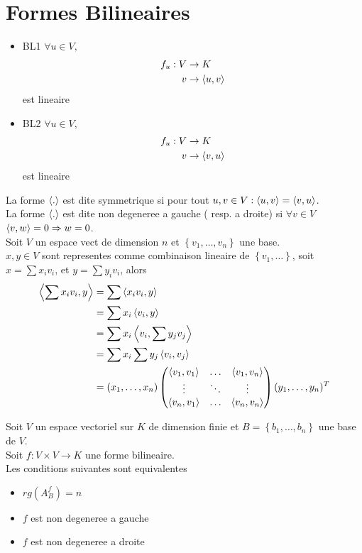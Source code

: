 \documentclass[../main.tex]{subfiles}
\begin{document}
\section{Formes Bilineaires}
\begin{defn}
	\begin{itemize}
	\item BL1 $\forall u \in V,$ 
		\begin{align*}
			f_u: V &\to K\\
			v &\to \left\langle u,v\right\rangle
		\end{align*}
		est lineaire
	
	\item BL2 $\forall u \in V,$ 
		\begin{align*}
			f_u: V &\to K\\
			v &\to \left\langle v,u\right\rangle
		\end{align*}
		est lineaire
	
	\end{itemize}
	
	
\end{defn}
La forme $\left\langle.\right\rangle$ est dite symmetrique si pour tout $u,v \in V: \left\langle u,v\right\rangle= \left\langle v,u\right\rangle$.\\
La forme $\left\langle.\right\rangle$ est dite non degeneree a gauche ( resp. a droite) si
$\forall v \in V$ $\left\langle v,w\right\rangle=0 \Rightarrow w=0$.\\
Soit $V$ un espace vect de dimension $n$ et $ \left\{ v_1, \ldots, v_n \right\} $ une base.\\
$ x,y \in V$ sont representes comme combinaison lineaire de $ \left\{ v_1, \ldots \right\} $, soit $x = \sum x_i v_i$, et $ y = \sum y_i v_i$, alors
\begin{align*}
	\left\langle \sum x_i v_i, y\right\rangle &= \sum \left\langle x_i v_i, y\right\rangle \\
				&= \sum x_i \left\langle v_i, y\right\rangle \\
				&= \sum x_i \left\langle v_i, \sum y_j v_j\right\rangle\\
				&= \sum x_i \sum y_j \left\langle v_i, v_j\right\rangle\\
				&= ( x_1, \ldots, x_n) 
				\begin{pmatrix}
					\left\langle v_1, v_1\right\rangle & \ldots & \left\langle v_1, v_n \right\rangle \\
\vdots & \ddots & \vdots \\
\left\langle v_n, v_1\right\rangle  & \ldots & \left\langle v_n,v_n\right\rangle 
				\end{pmatrix}
				( y_1, \ldots, y_n)^{T}
\end{align*}
\begin{propo}
	Soit $V$ un espace vectoriel sur $K$ de dimension finie et 
	$B= \left\{ b_1,\ldots, b_n \right\} $ une base de $V$. \\
	Soit $f: V \times V \to K$ une forme bilineaire. \\
	Les conditions suivantes sont equivalentes
	\begin{itemize}
		\item $rg ( A_B ^{f}) = n$ 
		\item $f$ est non degeneree a gauche
		\item $f$ est non degeneree a droite
	\end{itemize}
	
\end{propo}
\end{document}
